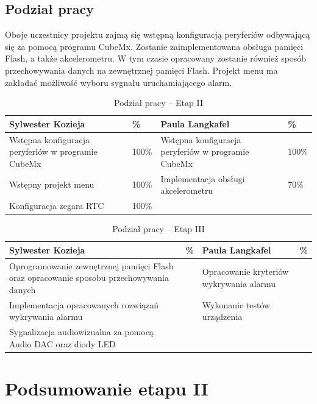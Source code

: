 \documentclass[10pt, a4paper]{article}
\begin{document}

\subsection{Podział pracy}
Oboje uczestnicy projektu zajmą się wstępną konfiguracją peryferiów odbywającą się za pomocą programu CubeMx. Zostanie zaimplementowana obsługa pamięci Flash, a także akcelerometru. W tym czasie opracowany zostanie również sposób przechowywania danych na zewnętrznej pamięci Flash. Projekt menu ma zakładać możliwość wyboru sygnału uruchamiającego alarm.

\begin{table}[H]
	\centering
	\begin{tabular}{|L{7cm}|L{0.8cm}||L{7cm}|L{0.8cm}|}
		\hline
		\hline
		\textbf{Sylwester Kozieja} & 
		\% & 
		\textbf{Paula Langkafel} & \%\\
		\hline
		\hline
		Wstępna konfiguracja peryferiów w programie CubeMx		& 100\%&	
		Wstępna konfiguracja peryferiów w programie CubeMx &100\%\\
		\hline
		Wstępny projekt menu& 100\%&
		Implementacja obsługi akcelerometru &70\%\\
		
		\hline Konfiguracja zegara RTC & 100\%& &\\
		\hline
	\end{tabular}
	\caption{Podział pracy -- Etap II}
	\label{tab:PodzialPracyEtap2}
\end{table}

\begin{table}[H]
	\centering
	\begin{tabular}{|L{7cm}|L{0.8cm}||L{7cm}|L{0.8cm}|}
		\hline
		\hline
		\textbf{Sylwester Kozieja} & 
		\% & 
		\textbf{Paula Langkafel} & \%\\
		\hline
		\hline
		Oprogramowanie zewnętrznej pamięci Flash oraz opracowanie sposobu przechowywania danych		& &	
		Opracowanie kryteriów wykrywania alarmu &\\
		\hline
		Implementacja opracowanych rozwiązań wykrywania alarmu  & &
		Wykonanie testów urządzenia &\\
		\hline
		Sygnalizacja audiowizualna za pomocą Audio DAC oraz diody LED & & &\\
		\hline
	\end{tabular}
	\caption{Podział pracy -- Etap III}
	\label{tab:PodzialPracyEtap3}
\end{table}

\section{Podsumowanie etapu II}
\end{document}
